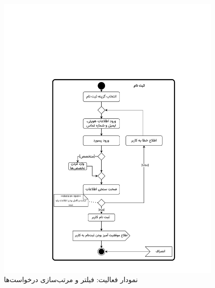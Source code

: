 \begin{figure}[ht!]
	\centering
	\includegraphics[scale=0.6, page=10]{figs/OOD-activity1-10.pdf}
	\caption{نمودار فعالیت: فیلتر و مرتب‌سازی درخواست‌ها}
\end{figure}
\FloatBarrier
\newpage

